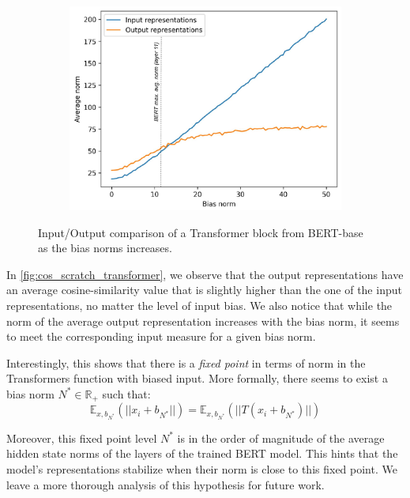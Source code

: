 \begin{figure}[ht]
\begin{subfigure}[b]{0.8\columnwidth}
    \vspace{1.2em}
    \end{subfigure}
    \begin{subfigure}[b]{0.8\columnwidth}
         \includegraphics[width=\linewidth]{sources/part_1/anisotropy/imgs/bert_base_norm_v_output.pdf}
         \label{fig:norm_scratch_transformer}
    \end{subfigure}
    \caption{Input/Output comparison of a Transformer block from BERT-base as the bias norms increases.}
    \label{fig:bias_vs_cosine_norm}
\end{figure}

In \autoref{fig:cos_scratch_transformer}, we observe that the output representations have an average cosine-similarity value that is slightly higher than the one of the input representations, no matter the level of input bias. We also notice that while the norm of the average output representation increases with the bias norm, it seems to meet the corresponding input measure for a given bias norm.

Interestingly, this shows that there is a \textit{fixed point} in terms of norm in the Transformers function with biased input. More formally, there seems to exist a bias norm $N^* \in \mathbb{R}_+$ such that: $$\mathbb{E}_{x, b_{N^*}}(||x_i + b_{N^*}||) = \mathbb{E}_{x, b_{N^*}}(||T(x_i + b_{N^*})||)$$

Moreover, this fixed point level $N^*$ is in the order of magnitude of the average hidden state norms of the layers of the trained BERT model. This hints that the model's representations stabilize when their norm is close to this fixed point. We leave a more thorough analysis of this hypothesis for future work.

